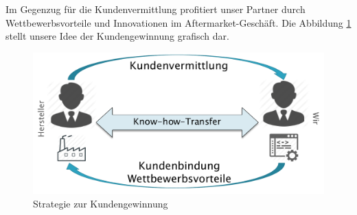Im Gegenzug für die Kundenvermittlung profitiert unser Partner durch Wettbewerbsvorteile und Innovationen im Aftermarket-Geschäft. Die Abbildung \ref{fig:Kundengewinnung} stellt unsere Idee der Kundengewinnung grafisch dar.

\begin{figure}[H]
\centering
\includegraphics[width=0.7\linewidth]{Bilder/Kundengewinnung}
\caption{Strategie zur Kundengewinnung}
\label{fig:Kundengewinnung}
\end{figure}